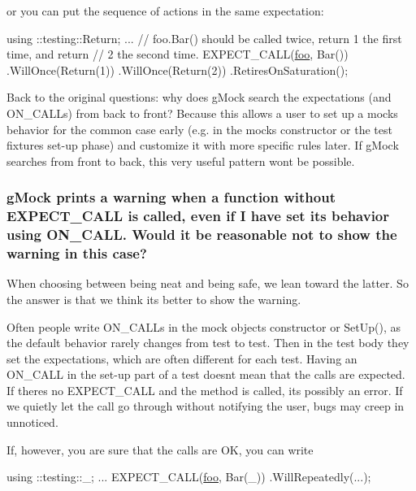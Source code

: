 or you can put the sequence of actions in the same expectation\+:


\begin{DoxyCode}
using ::testing::Return;
...
  \textcolor{comment}{// foo.Bar() should be called twice, return 1 the first time, and return}
  \textcolor{comment}{// 2 the second time.}
  EXPECT\_CALL(\mbox{\hyperlink{namespacefoo}{foo}}, Bar())
      .WillOnce(Return(1))
      .WillOnce(Return(2))
      .RetiresOnSaturation();
\end{DoxyCode}


Back to the original questions\+: why does g\+Mock search the expectations (and {\ttfamily O\+N\+\_\+\+C\+A\+LL}s) from back to front? Because this allows a user to set up a mock\textquotesingle{}s behavior for the common case early (e.\+g. in the mock\textquotesingle{}s constructor or the test fixture\textquotesingle{}s set-\/up phase) and customize it with more specific rules later. If g\+Mock searches from front to back, this very useful pattern won\textquotesingle{}t be possible.

\subsubsection*{g\+Mock prints a warning when a function without E\+X\+P\+E\+C\+T\+\_\+\+C\+A\+LL is called, even if I have set its behavior using O\+N\+\_\+\+C\+A\+LL. Would it be reasonable not to show the warning in this case?}

When choosing between being neat and being safe, we lean toward the latter. So the answer is that we think it\textquotesingle{}s better to show the warning.

Often people write {\ttfamily O\+N\+\_\+\+C\+A\+LL}s in the mock object\textquotesingle{}s constructor or {\ttfamily Set\+Up()}, as the default behavior rarely changes from test to test. Then in the test body they set the expectations, which are often different for each test. Having an {\ttfamily O\+N\+\_\+\+C\+A\+LL} in the set-\/up part of a test doesn\textquotesingle{}t mean that the calls are expected. If there\textquotesingle{}s no {\ttfamily E\+X\+P\+E\+C\+T\+\_\+\+C\+A\+LL} and the method is called, it\textquotesingle{}s possibly an error. If we quietly let the call go through without notifying the user, bugs may creep in unnoticed.

If, however, you are sure that the calls are OK, you can write


\begin{DoxyCode}
using ::testing::\_;
...
  EXPECT\_CALL(\mbox{\hyperlink{namespacefoo}{foo}}, Bar(\_))
      .WillRepeatedly(...);
\end{DoxyCode}


